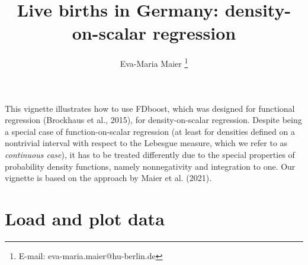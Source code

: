 \documentclass{article}
\newcommand{\Rpackage}[1]{{\normalfont\fontseries{b}\selectfont #1}}
\begin{document}



\title{Live births in Germany: density-on-scalar regression}
\author{Eva-Maria Maier
\thanks{E-mail: eva-maria.maier@hu-berlin.de}}
\date{}
\maketitle




\noindent
This vignette illustrates how to use \Rpackage{FDboost}, which was designed for functional regression (Brockhaus et al., 2015),
for density-on-scalar regression.
Despite being a special case of function-on-scalar regression (at least for densities defined on a nontrivial interval with respect to the Lebesgue measure, which we refer to as \emph{continuous case}), it has to be treated differently due to the special properties of probability density functions, namely nonnegativity and integration to one.
Our vignette is based on the approach by Maier et al. (2021).

\section{Load and plot data}
\end{document}
